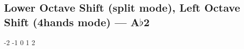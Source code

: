 \subsection{Lower Octave Shift (split mode), Left Octave Shift (4hands  mode) --- \UiKey{\SET}A$\flat$2}







































-2
-1
0
1
2
